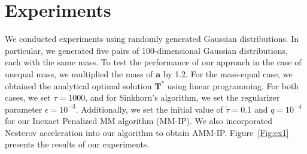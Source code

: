 \documentclass[a4paper,twocolumn]{article}
\newcommand{\mat}[1]{\mathbf{#1}}
\renewcommand{\vec}[1]{\bm{#1}}
\begin{document}
\section{Experiments}

We conducted experiments using randomly generated Gaussian distributions. In particular, we generated five pairs of 100-dimensional Gaussian distributions, each with the same mass. To test the performance of our approach in the case of unequal mass, we multiplied the mass of $\vec a$ by 1.2. For the mass-equal case, we obtained the analytical optimal solution $\mat T^{*}$ using linear programming. For both cases, we set $\tau = 1000$, and for Sinkhorn's algorithm, we set the regularizer parameter $\epsilon = 10^{-3}$. Additionally, we set the initial value of $\tilde{\tau} = 0.1$ and $q = 10^{-4}$ for our Inexact Penalized MM algorithm (MM-IP). We also incorporated Nesterov acceleration into our algorithm to obtain AMM-IP. Figure~\ref{Fig:ex1} presents the results of our experiments.
\end{document}
